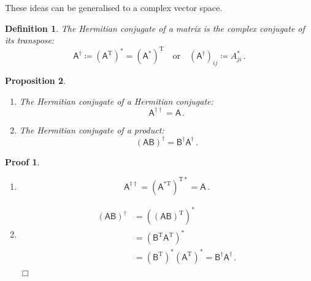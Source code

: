 \documentclass{article}
\theoremstyle{plain}\theoremheaderfont{\normalfont\itshape}\theorembodyfont{\rmfamily}\theoremseparator{.}\newtheorem*{rem}{Remark}\newtheorem*{ex}{Example}\newtheorem*{proof}{Proof}\newtheorem*{altp}{Alternative proof}
\theoremstyle{plain}\theoremheaderfont{\normalfont\bfseries}\theorembodyfont{\rmfamily}\theoremseparator{.}\newtheorem{thm}{Theorem}[section]\newtheorem{lem}[thm]{Lemma}\newtheorem{prop}[thm]{Proposition}\newtheorem*{cor}{Corollary}\newtheorem{defn}[thm]{Definition}\newtheorem{clm}[thm]{Claim}\newtheorem{clminproof}{Claim}
\theoremstyle{break}\theoremheaderfont{\normalfont\itshape}\theorembodyfont{\rmfamily}\theoremseparator{.\medskip}\newtheorem*{proofskip}{Proof}\newtheorem*{exs}{Examples}\newtheorem*{rems}{Remarks}
\theoremstyle{break}\theoremheaderfont{\normalfont\bfseries}\theorembodyfont{\rmfamily}\theoremseparator{.\medskip}\newtheorem{lemskip}[thm]{Lemma}\newtheorem{defnskip}[thm]{Definition}\newtheorem{propskip}[thm]{Proposition}\newtheorem{thmskip}[thm]{Theorem}
\numberwithin{equation}{section}
\newcommand{\qed}{\hfill\ensuremath{\Box}}
\newcommand{\tp}{^\mathrm{T}}
\begin{document}
	These ideas can be generalised to a complex vector space.
	
	\begin{defn}
		The \textit{Hermitian conjugate} of a matrix is the complex conjugate of its transpose:
		\[\mathsf{A}^\dagger\coloneqq(\mathsf{A}^{\mathrm{T}})^*=(\mathsf{A}^*)^{\mathrm{T}}\quad\text{or}\quad(\mathsf{A}^\dagger)_{ij}\coloneqq A^*_{ji}\,.\]
	\end{defn}
	\begin{propskip}
		\begin{enumerate}[topsep=0pt]
			\item The Hermitian conjugate of a Hermitian conjugate:
			\[\mathsf{A}^{\dagger\dagger}=\mathsf{A}\,.\]
			\item The Hermitian conjugate of a product:
			\[(\mathsf{AB})^\dagger=\mathsf{B^\dagger A^\dagger}\,.\]
		\end{enumerate}
	\end{propskip}
	\begin{proofskip}
		\begin{enumerate}[topsep=0pt]
			\item
			\[\mathsf{A}^{\dagger\dagger}=(\mathsf{A}^{*\mathrm{T}})^{\mathrm{T}*}=\mathsf{A}\,.\]
			\item
			\begin{align*}
				(\mathsf{AB})^\dagger&=((\mathsf{AB})\tp)^*\\
				&=(\mathsf{B\tp A\tp})^*\\
				&=(\mathsf{B}\tp)^*(\mathsf{A}\tp)^*=\mathsf{B^\dagger A^\dagger}\,.
			\end{align*}\qed
		\end{enumerate}
	\end{proofskip}
\end{document}
